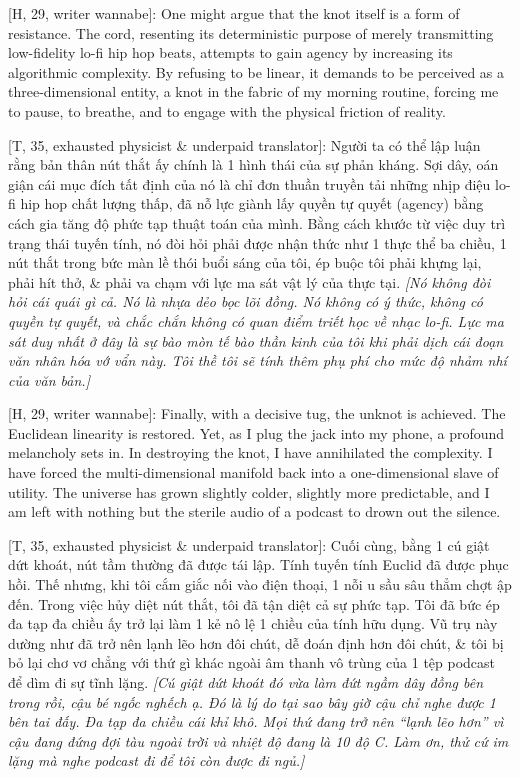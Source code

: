 \documentclass[11pt]{article}
\begin{document}
\vspace{2mm}
\textsf{[H, 29, writer wannabe]:} One might argue that the knot itself is a form of resistance. The cord, resenting its deterministic purpose of merely transmitting low-fidelity lo-fi hip hop beats, attempts to gain agency by increasing its algorithmic complexity. By refusing to be linear, it demands to be perceived as a three-dimensional entity, a knot in the fabric of my morning routine, forcing me to pause, to breathe, and to engage with the physical friction of reality.

\vspace{2mm}
\textsf{[T, 35, exhausted physicist \& underpaid translator]:} Người ta có thể lập luận rằng bản thân nút thắt ấy chính là 1 hình thái của sự phản kháng. Sợi dây, oán giận cái mục đích tất định của nó là chỉ đơn thuần truyền tải những nhịp điệu lo-fi hip hop chất lượng thấp, đã nỗ lực giành lấy quyền tự quyết (agency) bằng cách gia tăng độ phức tạp thuật toán của mình. Bằng cách khước từ việc duy trì trạng thái tuyến tính, nó đòi hỏi phải được nhận thức như 1 thực thể ba chiều, 1 nút thắt trong bức màn lề thói buổi sáng của tôi, ép buộc tôi phải khựng lại, phải hít thở, \& phải va chạm với lực ma sát vật lý của thực tại. \textit{[Nó không đòi hỏi cái quái gì cả. Nó là nhựa dẻo bọc lõi đồng. Nó không có ý thức, không có quyền tự quyết, và chắc chắn không có quan điểm triết học về nhạc lo-fi. Lực ma sát duy nhất ở đây là sự bào mòn tế bào thần kinh của tôi khi phải dịch cái đoạn văn nhân hóa vớ vẩn này. Tôi thề tôi sẽ tính thêm phụ phí cho mức độ nhảm nhí của văn bản.]}

\vspace{2mm}
\textsf{[H, 29, writer wannabe]:} Finally, with a decisive tug, the unknot is achieved. The Euclidean linearity is restored. Yet, as I plug the jack into my phone, a profound melancholy sets in. In destroying the knot, I have annihilated the complexity. I have forced the multi-dimensional manifold back into a one-dimensional slave of utility. The universe has grown slightly colder, slightly more predictable, and I am left with nothing but the sterile audio of a podcast to drown out the silence.

\vspace{2mm}
\textsf{[T, 35, exhausted physicist \& underpaid translator]:} Cuối cùng, bằng 1 cú giật dứt khoát, nút tầm thường đã được tái lập. Tính tuyến tính Euclid đã được phục hồi. Thế nhưng, khi tôi cắm giắc nối vào điện thoại, 1 nỗi u sầu sâu thẳm chợt ập đến. Trong việc hủy diệt nút thắt, tôi đã tận diệt cả sự phức tạp. Tôi đã bức ép đa tạp đa chiều ấy trở lại làm 1 kẻ nô lệ 1 chiều của tính hữu dụng. Vũ trụ này dường như đã trở nên lạnh lẽo hơn đôi chút, dễ đoán định hơn đôi chút, \& tôi bị bỏ lại chơ vơ chẳng với thứ gì khác ngoài âm thanh vô trùng của 1 tệp podcast để dìm đi sự tĩnh lặng. \textit{[Cú giật dứt khoát đó vừa làm đứt ngầm dây đồng bên trong rồi, cậu bé ngốc nghếch ạ. Đó là lý do tại sao bây giờ cậu chỉ nghe được 1 bên tai đấy. Đa tạp đa chiều cái khỉ khô. Mọi thứ đang trở nên ``lạnh lẽo hơn'' vì cậu đang đứng đợi tàu ngoài trời và nhiệt độ đang là 10 độ C. Làm ơn, thử cứ im lặng mà nghe podcast đi để tôi còn được đi ngủ.]}
\end{document}
